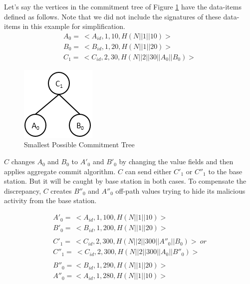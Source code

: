 		\begin{exmp}
			\label{ex1:malicious-activity}
			Let's say the vertices in the commitment tree of Figure \ref{fig:malicious-activity} have the data-items defined as follows.
			Note that we did not include the signatures of these data-items in this example for simplification.
			\begin{equation*}
				\begin{array}{l}
					A_{0} =\ <A_{id},1,10, H(N||1||10)>\\
					B_{0} =\ <B_{id},1,20, H(N||1||20)>\\
					C_{1} =\ <C_{id},2,30, H(N||2||30||A_{0}||B_{0})>
				\end{array}
			\end{equation*}

			\begin{figure}[t]
				\centering
				\includegraphics{images/commitment-tree-2.png}
				\caption{Smallest Possible Commitment Tree}
				\label{fig:malicious-activity}
			\end{figure}

			$C$ changes $A_{0}$ and $B_{0}$ to $A'_{0}$ and $B'_{0}$ by changing the value fields and then applies aggregate commit algorithm.
			$C$ can send either $C'_{1}$ or $C''_{1}$ to the base station.
			But it  will be caught by base station in both cases.
			To compensate the discrepancy, $C$ creates $B''_{0}$ and $A''_{0}$ off-path values trying to hide its malicious activity from the base station.

			\begin{equation*}
				\begin{array}{l}
					A'_{0} =\ <A_{id},1,100, H(N||1||10)>\\
					B'_{0} =\ <B_{id},1,200, H(N||1||20)>\\
					\\
					C'_{1} =\ <C_{id},2,300, H(N||2||300||A''_{0}||B_{0})>\ or \\ 
					C''_{1} =\ <C_{id},2,300, H(N||2||300||A_{0}||B''_{0})>\\
					\\
					B''_{0} = <B_{id},1,290,H(N||1||20)>\\
					A''_{0} = <A_{id},1,280,H(N||1||10)>
				\end{array}
			\end{equation*}


\end{exmp}
